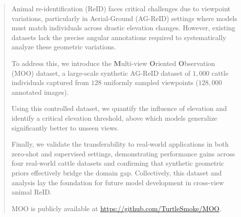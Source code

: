 \begin{abstract}
    Animal re-identification (ReID) faces critical challenges due to viewpoint variations, particularly in Aerial-Ground (AG-ReID) settings where models must match individuals across drastic elevation changes.
    However, existing datasets lack the precise angular annotations required to systematically analyze these geometric variations.

    To address this, we introduce the \textbf{M}ulti-view \textbf{O}riented \textbf{O}bservation (MOO) dataset, a large-scale synthetic AG-ReID dataset of $1,000$ cattle individuals captured from $128$ uniformly sampled viewpoints ($128,000$ annotated images).

    Using this controlled dataset, we quantify the influence of elevation and identify a critical elevation threshold, above which models generalize significantly better to unseen views.

    Finally, we validate the transferability to real-world applications in both zero-shot and supervised settings, demonstrating performance gains across four real-world cattle datasets and confirming that synthetic geometric priors effectively bridge the domain gap.
    Collectively, this dataset and analysis lay the foundation for future model development in cross-view animal ReID.

    MOO is publicly available at \url{https://github.com/TurtleSmoke/MOO}.
\end{abstract}
